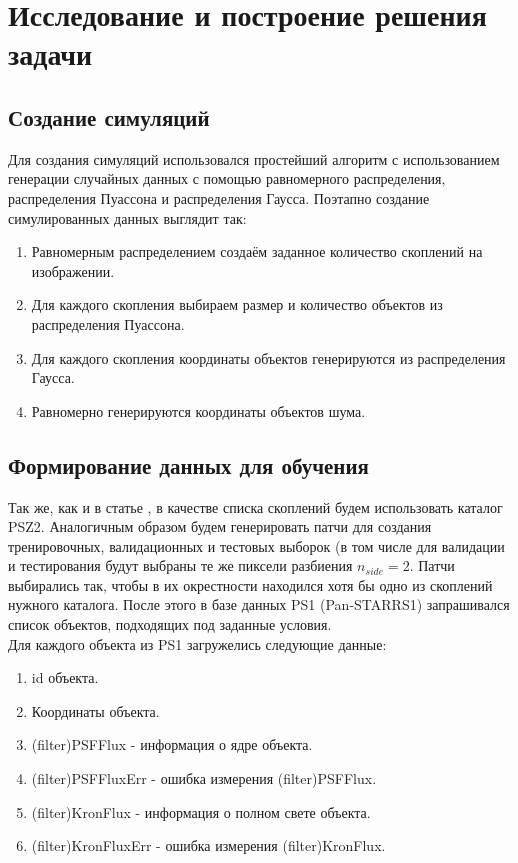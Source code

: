 \chapter{Исследование и построение решения задачи}
\label{cha:ch_3}
\section{Создание симуляций}
Для создания симуляций использовался простейший алгоритм с использованием генерации случайных 
данных с помощью равномерного распределения, распределения Пуассона и распределения Гаусса. 
Поэтапно создание симулированных данных выглядит так:

\begin{enumerate}
	\item Равномерным распределением создаём заданное количество скоплений на изображении.
	\item Для каждого скопления выбираем размер и количество объектов из распределения Пуассона.
	\item Для каждого скопления координаты объектов генерируются из распределения Гаусса.
	\item Равномерно генерируются координаты объектов шума.
\end{enumerate}


\section{Формирование данных для обучения}
Так же, как и в статье \cite{Bonjean}, в качестве списка скоплений будем использовать каталог PSZ2. 
Аналогичным образом будем генерировать патчи для создания тренировочных, валидационных и тестовых 
выборок (в том числе для валидации и тестирования будут выбраны те же пиксели разбиения $n_{side}=2$. 
Патчи выбирались так, чтобы в их окрестности находился хотя бы одно из скоплений нужного каталога. 
После этого в базе данных PS1 (Pan-STARRS1) запрашивался список объектов, подходящих под заданные 
условия. \\

Для каждого объекта из PS1 загружелись следующие данные:
\begin{enumerate}
    \item id объекта.
    \item Координаты объекта.
    \item (filter)PSFFlux - информация о ядре объекта.
    \item (filter)PSFFluxErr - ошибка измерения (filter)PSFFlux.
    \item (filter)KronFlux - информация о полном свете объекта.
    \item (filter)KronFluxErr - ошибка измерения (filter)KronFlux.
\end{enumerate}

